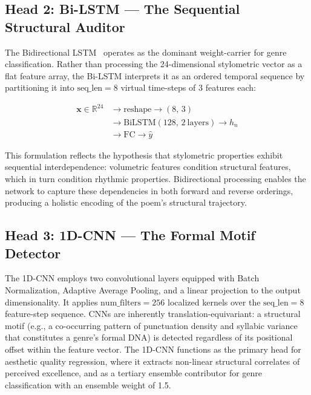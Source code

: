 \documentclass[conference]{IEEEtran}
\begin{document}
\subsection{Head 2: Bi-LSTM --- The Sequential Structural Auditor}

The Bidirectional LSTM~\cite{hochreiter1997} operates as the dominant
weight-carrier for genre classification. Rather than processing the
24-dimensional stylometric vector as a flat feature array, the Bi-LSTM
interprets it as an ordered temporal sequence by partitioning it into
$\text{seq\_len} = 8$ virtual time-steps of 3 features each:


\begin{equation}
\begin{aligned}
\mathbf{x} \in \mathbb{R}^{24}
&\rightarrow \mathrm{reshape} \rightarrow (8,\,3) \\
&\rightarrow \mathrm{BiLSTM}(128,\,2\ \mathrm{layers}) \rightarrow h_n \\
&\rightarrow \mathrm{FC} \rightarrow \hat{y}
\end{aligned}
\end{equation}

This formulation reflects the hypothesis that stylometric properties
exhibit sequential interdependence: volumetric features condition
structural features, which in turn condition rhythmic properties.
Bidirectional processing enables the network to capture these
dependencies in both forward and reverse orderings, producing a
holistic encoding of the poem's structural trajectory.

\subsection{Head 3: 1D-CNN --- The Formal Motif Detector}

The 1D-CNN employs two convolutional layers equipped with Batch
Normalization, Adaptive Average Pooling, and a linear projection to the
output dimensionality. It applies $\text{num\_filters} = 256$ localized
kernels over the $\text{seq\_len} = 8$ feature-step sequence. CNNs are
inherently translation-equivariant: a structural motif (e.g., a
co-occurring pattern of punctuation density and syllabic variance that
constitutes a genre's formal DNA) is detected regardless of its
positional offset within the feature vector. The 1D-CNN functions as the
primary head for aesthetic quality regression, where it extracts
non-linear structural correlates of perceived excellence, and as a
tertiary ensemble contributor for genre classification with an ensemble
weight of 1.5.
\end{document}
